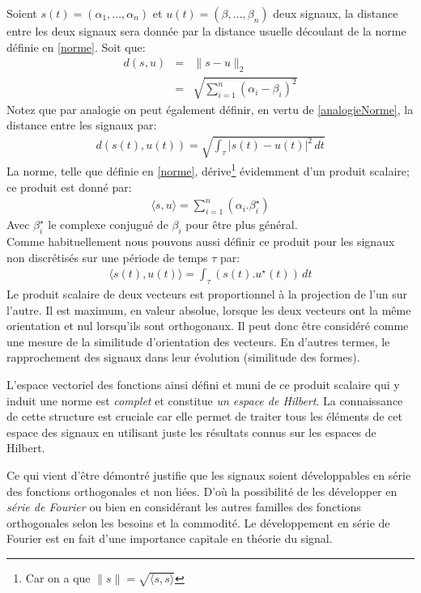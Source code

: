 Soient $ s(t) = (\alpha_1,\dots,\alpha_n) $ et $ u(t) = (\beta,\dots,\beta_n) $ deux signaux, la distance entre les deux signaux sera donnée par la distance usuelle découlant de la norme définie en \ref{norme}. Soit que:
\begin{eqnarray}\label{distance}
d(s,u) &=& \|s-u\|_{2} \\
	   &=& \sqrt{\sum_{i=1}^{n}(\alpha_i-\beta_i)^2} 
\end{eqnarray}
Notez que par analogie on peut également définir, en vertu de \ref{analogieNorme}, la distance entre les signaux par:
\begin{eqnarray}
d(s(t),u(t)) = \sqrt{\int_{\tau}|s(t)-u(t)|^2\,dt}
\end{eqnarray}
La norme, telle que définie en \ref{norme}, dérive\footnote{Car on a que $ \|s\|=\sqrt{\langle s,s \rangle} $} évidemment d'un produit scalaire\cite{TopoHilb}; ce produit est donné par:
\begin{eqnarray}
\langle s,u \rangle = \sum_{i=1}^{n}(\alpha_i.\beta_i^{\star})
\end{eqnarray}
Avec $ \beta_i^{\star} $ le complexe conjugué de $ \beta_i $ pour être plus général.\\
Comme habituellement nous pouvons aussi définir ce produit pour les signaux non discrétisés sur une période de temps $ \tau $ par:
\begin{eqnarray}
\langle s(t),u(t )\rangle = \int_{\tau}(s(t).u^{\star}(t))\,dt
\end{eqnarray}
Le produit scalaire de deux vecteurs est proportionnel à la projection de l'un sur l'autre. Il est maximum, en valeur absolue, lorsque les deux vecteurs ont la même orientation et nul lorsqu'ils sont orthogonaux. Il peut donc être considéré comme une mesure de la similitude d'orientation des vecteurs. En d'autres termes, le rapprochement des signaux dans leur évolution (similitude des formes).


L'espace vectoriel des fonctions ainsi défini et muni de ce produit scalaire qui y induit une norme est \emph{complet}\cite{TopoHilb} et constitue \emph{un espace de Hilbert}. La connaissance de cette structure est cruciale car elle permet de traiter tous les éléments de cet espace des signaux en utilisant juste les résultats connus sur les espaces de Hilbert.

Ce qui vient d'être démontré justifie que les signaux soient développables  en série des fonctions orthogonales et non liées. D'où la possibilité de les développer en \emph{série de Fourier} ou bien en considérant les autres familles des fonctions orthogonales selon les besoins et la commodité. Le développement en série de Fourier est en fait d'une importance capitale en théorie du signal.
